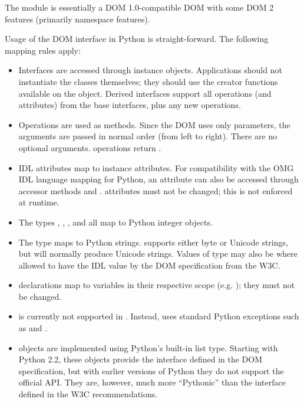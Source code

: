 The  module is essentially a DOM
1.0-compatible DOM with some DOM 2 features (primarily namespace
features).

Usage of the DOM interface in Python is straight-forward.  The
following mapping rules apply:

\begin{itemize}
\item Interfaces are accessed through instance objects. Applications
      should not instantiate the classes themselves; they should use
      the creator functions available on the  object.
      Derived interfaces support all operations (and attributes) from
      the base interfaces, plus any new operations.

\item Operations are used as methods. Since the DOM uses only
       parameters, the arguments are passed in normal
      order (from left to right).   There are no optional
      arguments.  operations return .

\item IDL attributes map to instance attributes. For compatibility
      with the OMG IDL language mapping for Python, an attribute
       can also be accessed through accessor methods
       and .  
      attributes must not be changed; this is not enforced at
      runtime.

\item The types , , , and  all map to Python integer
      objects.

\item The type  maps to Python strings.
       supports either byte or Unicode
      strings, but will normally produce Unicode strings.  Values
      of type  may also be  where allowed
      to have the IDL  value by the DOM specification from
      the W3C.

\item {} declarations map to variables in their
      respective scope
      (e.g. );
      they must not be changed.

\item {} is currently not supported in
      .  Instead,
       uses standard Python exceptions such
      as  and .

\item {} objects are implemented using Python's built-in
      list type.  Starting with Python 2.2, these objects provide the
      interface defined in the DOM specification, but with earlier
      versions of Python they do not support the official API.  They
      are, however, much more ``Pythonic'' than the interface defined
      in the W3C recommendations.
\end{itemize}


